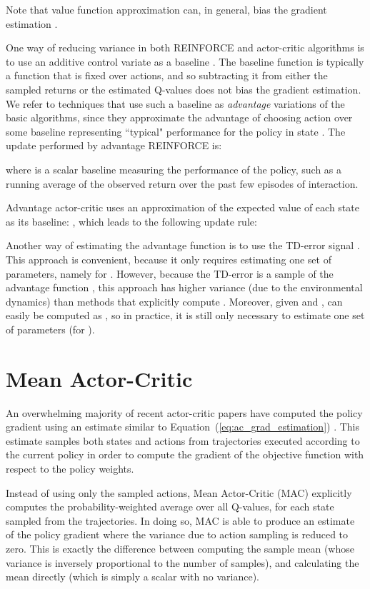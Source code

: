 \documentclass[letterpaper]{article}
\begin{document}
Note that value function approximation can, in general, bias the gradient estimation \cite{baxter2001infinite}.

One way of reducing variance in both REINFORCE and actor-critic algorithms is to use an additive control variate as a baseline \cite{williams1992simple,sutton2000policy,greensmith2004variance}. The baseline function is typically a function that is fixed over actions, and so subtracting it from either the sampled returns or the estimated Q-values does not bias the gradient estimation. We refer to techniques that use such a baseline as \textit{advantage} variations of the basic algorithms, since they approximate the advantage  of choosing action  over some baseline representing ``typical" performance for the policy in state  \cite{baird1994reinforcement}. The update performed by advantage REINFORCE is:

where  is a scalar baseline measuring the performance of the policy, such as a running average of the observed return over the past few episodes of interaction.

Advantage actor-critic uses an approximation of the expected value of each state  as its baseline: , which leads to the following update rule:


Another way of estimating the advantage function is to use the TD-error signal . This approach is convenient, because it only requires estimating one set of parameters, namely for . However, because the TD-error is a sample of the advantage function , this approach has higher variance (due to the environmental dynamics) than methods that explicitly compute . Moreover, given  and ,  can easily be computed as , so in practice, it is still only necessary to estimate one set of parameters (for ).

\section{Mean Actor-Critic}
An overwhelming majority of recent actor-critic papers have computed the policy gradient using an estimate similar to Equation~(\ref{eq:ac_grad_estimation}) \cite{degris2012off,mnih2016asynchronous,wang2016sample}. This estimate samples both states and actions from trajectories executed according to the current policy in order to compute the gradient of the objective function with respect to the policy weights.

Instead of using only the sampled actions, Mean Actor-Critic (MAC) explicitly computes the probability-weighted average over all Q-values, for each state sampled from the trajectories. In doing so, MAC is able to produce an estimate of the policy gradient where the variance due to action sampling is reduced to zero. This is exactly the difference between computing the sample mean (whose variance is inversely proportional to the number of samples), and calculating the mean directly (which is simply a scalar with no variance).
\end{document}

